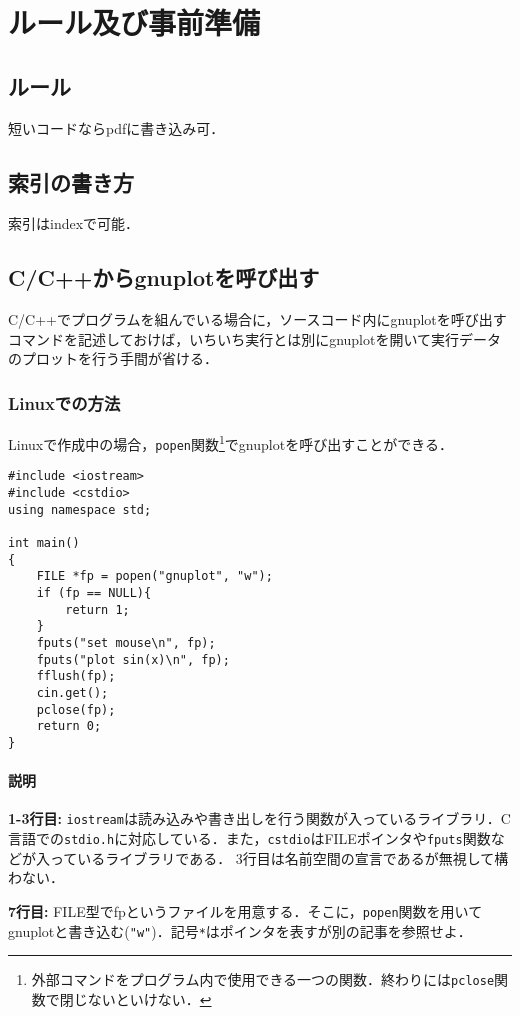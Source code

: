 \chapter{ルール及び事前準備}
\section{ルール}
短いコードならpdfに書き込み可．



\section{索引の書き方}

索引はindexで可能．

\section{ C/C++からgnuplotを呼び出す}
C/C++でプログラムを組んでいる場合に，ソースコード内にgnuplotを呼び出すコマンドを記述しておけば，いちいち実行とは別にgnuplotを開いて実行データのプロットを行う手間が省ける．

\subsection{ Linuxでの方法}
Linuxで作成中の場合，\texttt{popen}関数\footnote{外部コマンドをプログラム内で使用できる一つの関数．終わりには\texttt{pclose}関数で閉じないといけない．}でgnuplotを呼び出すことができる．
\begin{lstlisting}[caption=C++のコード内からgnuplotを呼び出し$\sin x$を描く]
#include <iostream>
#include <cstdio>
using namespace std;

int main()
{
	FILE *fp = popen("gnuplot", "w");
	if (fp == NULL){
		return 1;
	}
	fputs("set mouse\n", fp);
	fputs("plot sin(x)\n", fp);
	fflush(fp);
	cin.get();
	pclose(fp);
	return 0;
}
\end{lstlisting}

\subsubsection{ 説明}
\textbf{1-3行目:}
\texttt{iostream}は読み込みや書き出しを行う関数が入っているライブラリ．C言語での\texttt{stdio.h}に対応している．また，\texttt{cstdio}はFILEポインタや\texttt{fputs}関数などが入っているライブラリである．
3行目は名前空間の宣言であるが無視して構わない．

\textbf{7行目:}
FILE型でfpというファイルを用意する．そこに，\texttt{popen}関数を用いてgnuplotと書き込む(\texttt{"w"})．記号\texttt{*}はポインタを表すが別の記事を参照せよ．

